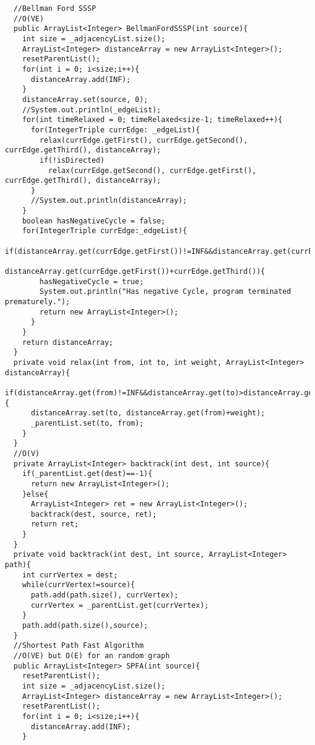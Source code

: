 \documentclass[11pt]{article}
\theoremstyle{definition}
\begin{document}
\begin{verbatim}
  //Bellman Ford SSSP
  //O(VE)
  public ArrayList<Integer> BellmanFordSSSP(int source){
    int size = _adjacencyList.size();
    ArrayList<Integer> distanceArray = new ArrayList<Integer>();
    resetParentList();
    for(int i = 0; i<size;i++){
      distanceArray.add(INF);
    }
    distanceArray.set(source, 0);
    //System.out.println(_edgeList);
    for(int timeRelaxed = 0; timeRelaxed<size-1; timeRelaxed++){
      for(IntegerTriple currEdge: _edgeList){
        relax(currEdge.getFirst(), currEdge.getSecond(), currEdge.getThird(), distanceArray);
        if(!isDirected)
          relax(currEdge.getSecond(), currEdge.getFirst(), currEdge.getThird(), distanceArray);
      }
      //System.out.println(distanceArray);
    }
    boolean hasNegativeCycle = false;
    for(IntegerTriple currEdge:_edgeList){
      if(distanceArray.get(currEdge.getFirst())!=INF&&distanceArray.get(currEdge.getSecond())>
                                                      distanceArray.get(currEdge.getFirst())+currEdge.getThird()){
        hasNegativeCycle = true;
        System.out.println("Has negative Cycle, program terminated prematurely.");
        return new ArrayList<Integer>();
      }
    }
    return distanceArray;
  }
  private void relax(int from, int to, int weight, ArrayList<Integer> distanceArray){
    if(distanceArray.get(from)!=INF&&distanceArray.get(to)>distanceArray.get(from)+weight){
      distanceArray.set(to, distanceArray.get(from)+weight);
      _parentList.set(to, from);
    }
  }
  //O(V)
  private ArrayList<Integer> backtrack(int dest, int source){
    if(_parentList.get(dest)==-1){
      return new ArrayList<Integer>();
    }else{
      ArrayList<Integer> ret = new ArrayList<Integer>();
      backtrack(dest, source, ret);
      return ret; 
    }
  }
  private void backtrack(int dest, int source, ArrayList<Integer> path){
    int currVertex = dest;
    while(currVertex!=source){
      path.add(path.size(), currVertex);
      currVertex = _parentList.get(currVertex);
    }
    path.add(path.size(),source);
  }
  //Shortest Path Fast Algorithm
  //O(VE) but O(E) for an random graph
  public ArrayList<Integer> SPFA(int source){
    resetParentList();
    int size = _adjacencyList.size();
    ArrayList<Integer> distanceArray = new ArrayList<Integer>();
    resetParentList();
    for(int i = 0; i<size;i++){
      distanceArray.add(INF);
    }
    

\end{verbatim}
\end{document}
